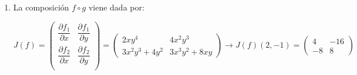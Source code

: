 \begin{enumerate}[label=\c olor{red}\textbf{\arabic*)}, leftmargin=*]
Ahora calculamos el límite cuando $x\to0$ para evaluar $\dfrac{\partial}{\partial x}\left(\dfrac{\partial f}{\partial y}\right)(0,0)$. \[ \lim_{h
\to0}\dfrac{\frac{\partial f}{\partial y}(h,0)-\frac{\partial f}{\partial y}(0,0)}{h}=\lb{(\ast)}=\lim_{h\to0}\dfrac{\frac{h-\sin h}{h^2}-0}{h}=\left\{\sin h\approx h-\dfrac{h^3}{6}\right\}=\lim_{h\to0}\dfrac{\cancel{h}-\left(\cancel{h}-\frac{h^3}{6}\right)}{h^3}=\lim_{h\to0}\dfrac{\frac{h^3}{6}}{h^3}=\dfrac{1}{6} \]
$\lb{(\ast)=}\dfrac{\partial f}{\partial y}(h,0)=\dfrac{(h\cancelto{1}{\cos0}-\sin h)\cdot \cancel{h^2}}{h^{\cancel{4}}}=\dfrac{h-\sin h}{h^2}$

$\dfrac{\partial^2 f}{\partial y\partial x}(0,0)=\dfrac{\partial }{\partial y}\left(\dfrac{\partial f}{\partial x}(x,y)\right)=\dfrac{\partial }{\partial y}\left(\dfrac{(\sin y-y\cos x)\cdot(x^2+y^2)-(x\sin y-y\sin x)\cdot2x}{(x^2+y^2)^2}\right)$


Ahora calculamos el límite cuando $y\to0$ para evaluar $\dfrac{\partial }{\partial y}\left(\dfrac{\partial f}{\partial x}\right)(0,0)$. \[ \lim_{k\to0}\dfrac{\frac{\partial f}{\partial x}(0, k)-\frac{\partial f}{\partial x}(0,0)}{k}=\lb{(\ast)}=\lim_{k\to0}\dfrac{\frac{\sin k-k}{k^2}-0}{k}=\left\{\sin k\approx k-\dfrac{k^3}{6}\right\}=\lim_{k\to0}\dfrac{\left(\cancel{k}-\frac{k^3}{6}\right)-\cancel{k}}{k^3}=\lim_{k\to0}-\dfrac{\frac{k^3}{6}}{k^3}=-\dfrac{1}{6} \]
$\lb{(\ast)=} \dfrac{\partial f}{\partial x}(0,k)=\dfrac{(\sin k-k\cancelto{1}{\cos0})\cdot \cancel{k^2}}{k^{\cancel{4}}}=\dfrac{\sin k-k}{k^2}$

\item {}


La composición $f\circ g$ viene dada por:
\begin{center}
\end{center}

$J(f)=\begin{pmatrix}
\dfrac{\partial f_1}{\partial x} & \dfrac{\partial f_1}{\partial y}\\
\dfrac{\partial f_2}{\partial x} & \dfrac{\partial f_2}{\partial y}\\
\end{pmatrix}=\begin{pmatrix}
2xy^4 & 4x^2y^3\\
3x^2y^3+4y^2 & 3x^3y^2+8xy
\end{pmatrix}\longrightarrow J(f)(2,-1)=\begin{pmatrix}
4 & -16\\
-8 & 8
\end{pmatrix}$


\end{enumerate}
